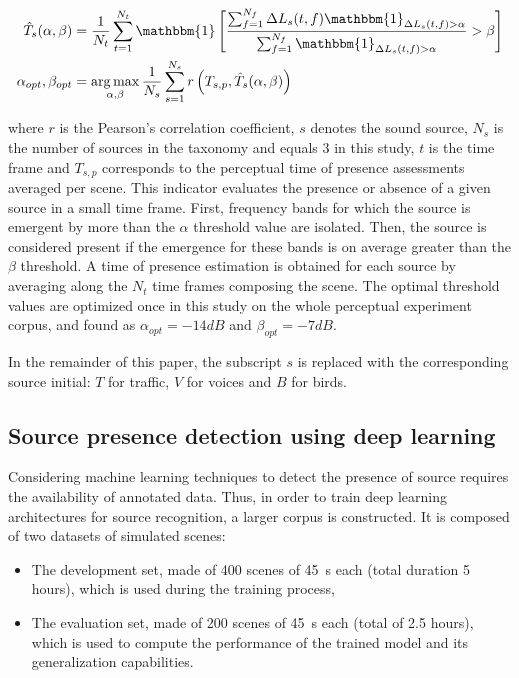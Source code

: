 \documentclass[twocolumn]{article}
\DeclareMathOperator*{\argmax}{arg\,max}
\begin{document}
\begin{align}
\hat T_s(\alpha, \beta) &= \frac{1}{N_t}\sum_{t = 1}^{N_t}\mathbbm{1}\left[ \frac{\sum_{f = 1}^{N_f}\Delta L_{s}(t, f)\mathbbm{1}_{\Delta L_{s}(t, f)>\alpha}}{\sum_{f = 1}^{N_f}\mathbbm{1}_{\Delta L_{s}(t, f)>\alpha}}>\beta \right]\\
\alpha_{opt},\beta_{opt} &= \argmax_{\alpha, \beta}\frac{1}{N_s}\sum_{s = 1}^{N_s}r\left(T_{s, p}, \hat T_s(\alpha, \beta)\right)
\end{align}

where $r$ is the Pearson's correlation coefficient, $s$ denotes the sound source, $N_s$ is the number of sources in the taxonomy and equals 3 in this study, $t$ is the time frame and $T_{s, p}$ corresponds to the perceptual time of presence assessments averaged per scene. This indicator evaluates the presence or absence of a given source in a small time frame. First, frequency bands for which the source is emergent by more than the $\alpha$ threshold value are isolated. Then, the source is considered present if the emergence for these bands is on average greater than the $\beta$ threshold. A time of presence estimation is obtained for each source by averaging along the $N_t$ time frames composing the scene. The optimal threshold values are optimized once in this study on the whole perceptual experiment corpus, and found as $\alpha_{opt} = -14dB$ and $\beta_{opt} = -7dB$.

In the remainder of this paper, the subscript $s$ is replaced with the corresponding source initial: $T$ for traffic, $V$ for voices and $B$ for birds.


\subsection{Source presence detection using deep learning}
\label{sec:methods_deep}

Considering machine learning techniques to detect the presence of source requires the availability of annotated data. Thus, in order to train deep learning architectures for source recognition, a larger corpus is constructed. It is composed of two datasets of simulated scenes:
\begin{itemize}
\item The development set, made of 400 scenes of 45~s each (total duration 5 hours), which is used during the training process,
\item The evaluation set, made of 200 scenes of 45~s each (total of 2.5 hours), which is used to compute the performance of the trained model and its generalization capabilities.
\end{itemize}
\end{document}
